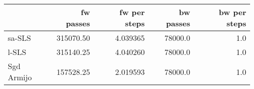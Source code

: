 \begin{tabular}{lrrrr}
\toprule
{} &  fw passes &  fw per steps &  bw passes &  bw per steps \\
\midrule
sa-SLS     &  315070.50 &      4.039365 &    78000.0 &           1.0 \\
l-SLS      &  315140.25 &      4.040260 &    78000.0 &           1.0 \\
Sgd Armijo &  157528.25 &      2.019593 &    78000.0 &           1.0 \\
\bottomrule
\end{tabular}
